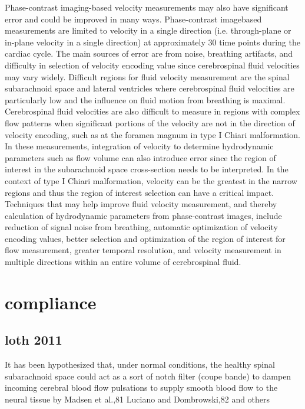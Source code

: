 \documentclass{report}
\begin{document}
Phase-contrast imaging-based velocity measurements
may also have significant error and could be
improved in many ways. Phase-contrast imagebased
measurements are limited to velocity in a
single direction (i.e. through-plane or in-plane
velocity in a single direction) at approximately 30
time points during the cardiac cycle. The main
sources of error are from noise, breathing artifacts,
and difficulty in selection of velocity encoding value
since cerebrospinal fluid velocities may vary widely.
Difficult regions for fluid velocity measurement are
the spinal subarachnoid space and lateral ventricles
where cerebrospinal fluid velocities are particularly
low and the influence on fluid motion from breathing
is maximal. Cerebrospinal fluid velocities are
also difficult to measure in regions with complex
flow patterns when significant portions of the
velocity are not in the direction of velocity
encoding, such as at the foramen magnum in type
I Chiari malformation. In these measurements,
integration of velocity to determine hydrodynamic
parameters such as flow volume can also introduce
error since the region of interest in the subarachnoid
space cross-section needs to be interpreted. In
the context of type I Chiari malformation, velocity
can be the greatest in the narrow regions and thus
the region of interest selection can have a critical
impact. Techniques that may help improve fluid
velocity measurement, and thereby calculation of
hydrodynamic parameters from phase-contrast
images, include reduction of signal noise from
breathing, automatic optimization of velocity encoding
values, better selection and optimization of
the region of interest for flow measurement, greater
temporal resolution, and velocity measurement in
multiple directions within an entire volume of
cerebrospinal fluid.

\section{compliance}

\subsection{loth 2011}

It has been hypothesized that, under normal
conditions, the healthy spinal subarachnoid space
could act as a sort of notch filter (coupe bande) to dampen
incoming cerebral blood flow pulsations to supply
smooth blood flow to the neural tissue by Madsen
et al.,81 Luciano and Dombrowski,82 and others
\end{document}
